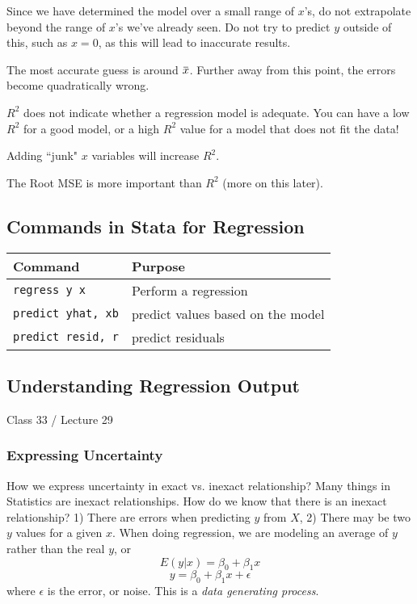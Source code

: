 \documentclass[11pt, oneside]{article}   	%
\newcommand{\overbar}[1]{\mkern 1.5mu\overline{\mkern-1.5mu#1\mkern-1.5mu}\mkern 1.5mu}
\begin{document}
Since we have determined the model over a small range of $x$'s, do not extrapolate beyond the range of $x$'s we've already seen. Do not try to predict $y$ outside of this, such as $x=0$, as this will lead to inaccurate results.

The most accurate guess is around $\overbar{x}$. Further away from this point, the errors become quadratically wrong.

$R^2$ does not indicate whether a regression model is adequate. You can have a low $R^2$ for a good model, or a high $R^2$ value for a model that does not fit the data! 

Adding ``junk" $x$ variables will increase $R^2$.

The Root MSE is more important than $R^2$ (more on this later).

\subsection{Commands in Stata for Regression}

\begin{tabular}{l p{ } }
Command & Purpose \\
\hline
\texttt{regress y x} & Perform a regression \\

\texttt{predict yhat, xb} & predict values based on the model \\

\texttt{predict resid, r} & predict residuals \\

\end{tabular}


\subsection{Understanding Regression Output}

Class 33 / Lecture 29
\subsubsection{Expressing Uncertainty}

How we express uncertainty in exact vs. inexact relationship? Many things in Statistics are inexact relationships. How do we know that there is an inexact relationship? 1) There are errors when predicting $y$ from $X$, 2) There may be two $y$ values for a given $x$. When doing regression, we are modeling an average of $y$ rather than the real $y$, or 
\[
E(y|x) = \beta_0 + \beta_1 x
\]
\[
y = \beta_0 + \beta_1 x + \epsilon
\]
where $\epsilon$ is the error, or noise. This is a \textit{data generating process}. 
\end{document}
